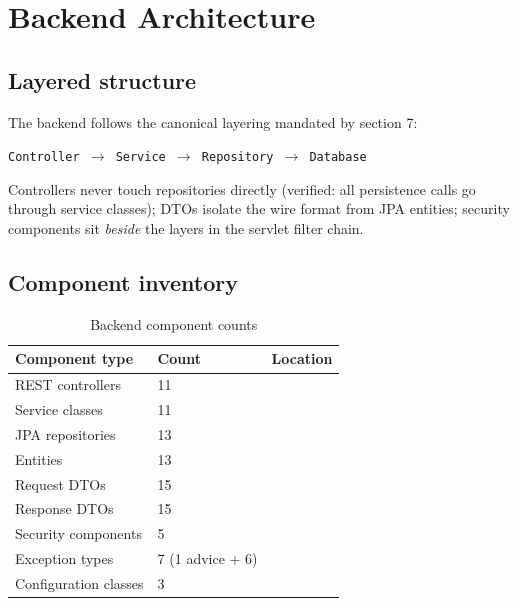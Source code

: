 \section{Backend Architecture}
\label{sec:backend-architecture}

\subsection{Layered structure}

The backend follows the canonical layering mandated by  section 7:

\begin{center}
\texttt{Controller $\rightarrow$ Service $\rightarrow$ Repository $\rightarrow$ Database}
\end{center}

\noindent Controllers never touch repositories directly (verified: all persistence calls go through service classes); DTOs isolate the wire format from JPA entities; security components sit \emph{beside} the layers in the servlet filter chain.

\subsection{Component inventory}
\begin{table}[H]
\centering
\caption{Backend component counts}
\label{tab:backend-inventory}
\begin{tabular}{@{}L{5.0cm}C{2.2cm}L{6.4cm}@{}}
\toprule
\textbf{Component type} & \textbf{Count} & \textbf{Location} \\
\midrule
REST controllers & 11 &  \\
Service classes & 11 &  \\
JPA repositories & 13 &  \\
Entities & 13 &  \\
Request DTOs & 15 &  \\
Response DTOs & 15 &  \\
Security components & 5 &  \\
Exception types & 7 (1 advice + 6) &  \\
Configuration classes & 3 &  \\
\bottomrule
\end{tabular}
\end{table}

